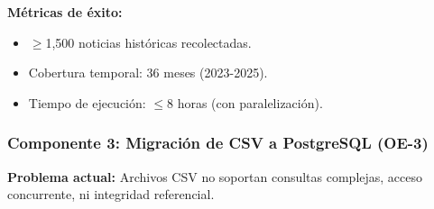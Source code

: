 \textbf{Métricas de éxito:}
\begin{itemize}
    \item $\geq$1,500 noticias históricas recolectadas.
    \item Cobertura temporal: 36 meses (2023-2025).
    \item Tiempo de ejecución: $\leq$8 horas (con paralelización).
\end{itemize}

\subsubsection{Componente 3: Migración de CSV a PostgreSQL (OE-3)}
\label{subsubsec:postgresql}

\textbf{Problema actual:} Archivos CSV no soportan consultas complejas, acceso concurrente, ni integridad referencial.
